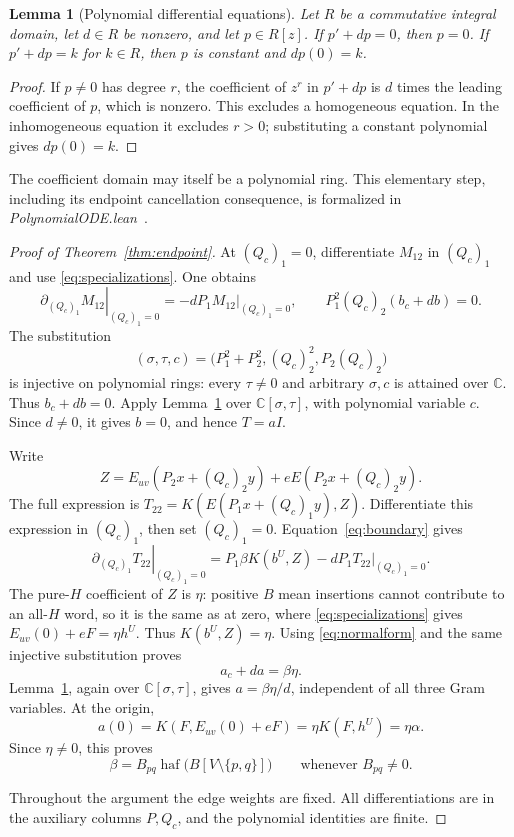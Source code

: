 \documentclass[11pt]{article}
\newtheorem{lemma}[theorem]{Lemma}
\theoremstyle{definition}
\theoremstyle{plain}
\numberwithin{equation}{section}
\begin{document}
\begin{lemma}[Polynomial differential equations]\label{lem:ode}
Let \(R\) be a commutative integral domain, let \(d\in R\) be nonzero,
and let \(p\in R[z]\). If \(p'+dp=0\), then \(p=0\). If
\(p'+dp=k\) for \(k\in R\), then \(p\) is constant and \(dp(0)=k\).
\end{lemma}

\begin{proof}
If \(p\ne0\) has degree \(r\), the coefficient of \(z^r\) in \(p'+dp\)
is \(d\) times the leading coefficient of \(p\), which is nonzero.
This excludes a homogeneous equation. In the inhomogeneous equation it
excludes \(r>0\); substituting a constant polynomial gives \(dp(0)=k\).
\end{proof}

The coefficient domain may itself be a polynomial ring. This elementary
step, including its endpoint cancellation consequence, is formalized in
\emph{PolynomialODE.lean}~\cite{lean}.

\begin{proof}[Proof of Theorem~\ref{thm:endpoint}]
At \((Q_c)_1=0\), differentiate \(M_{12}\) in \((Q_c)_1\) and use
\eqref{eq:specializations}. One obtains
\[
 \left.\partial_{(Q_c)_1}M_{12}\right|_{(Q_c)_1=0}
       =-dP_1\left.M_{12}\right|_{(Q_c)_1=0},
 \qquad P_1^2(Q_c)_2(b_c+db)=0.
\]
The substitution
\[
 (\sigma,\tau,c)=\bigl(P_1^2+P_2^2,(Q_c)_2^2,P_2(Q_c)_2\bigr)
\]
is injective on polynomial rings: every \(\tau\ne0\) and arbitrary
\(\sigma,c\) is attained over \(\mathbb C\). Thus \(b_c+db=0\).
Apply Lemma~\ref{lem:ode} over \(\mathbb C[\sigma,\tau]\), with polynomial
variable \(c\). Since \(d\ne0\), it gives \(b=0\), and hence \(T=aI\).

Write
\[
 Z=E_{uv}(P_2x+(Q_c)_2y)+eE(P_2x+(Q_c)_2y).
\]
The full expression is \(T_{22}=K(E(P_1x+(Q_c)_1y),Z)\). Differentiate
this expression in \((Q_c)_1\), then set \((Q_c)_1=0\).
Equation~\eqref{eq:boundary} gives
\[
 \left.\partial_{(Q_c)_1}T_{22}\right|_{(Q_c)_1=0}
 =P_1\beta K(b^U,Z)-dP_1\left.T_{22}\right|_{(Q_c)_1=0}.
\]
The pure-\(H\) coefficient of \(Z\) is \(\eta\): positive \(B\) mean
insertions cannot contribute to an all-\(H\) word, so it is the same as
at zero, where \eqref{eq:specializations} gives
\(E_{uv}(0)+eF=\eta h^U\). Thus \(K(b^U,Z)=\eta\). Using
\eqref{eq:normalform} and the same injective substitution proves
\[
 a_c+da=\beta\eta.
\]
Lemma~\ref{lem:ode}, again over \(\mathbb C[\sigma,\tau]\), gives
\(a=\beta\eta/d\), independent of all three Gram variables. At the origin,
\[
 a(0)=K(F,E_{uv}(0)+eF)=\eta K(F,h^U)=\eta\alpha.
\]
Since \(\eta\ne0\), this proves
\begin{equation}
 \beta=B_{pq}\operatorname{haf}\bigl(B[V\setminus\{p,q\}]\bigr)
 \qquad\text{whenever }B_{pq}\ne0.
 \tag{10}\label{eq:endpoint}
\end{equation}

Throughout the argument the edge weights are fixed. All differentiations are
in the auxiliary columns \(P,Q_c\), and the polynomial identities are finite.
\end{proof}
\end{document}
